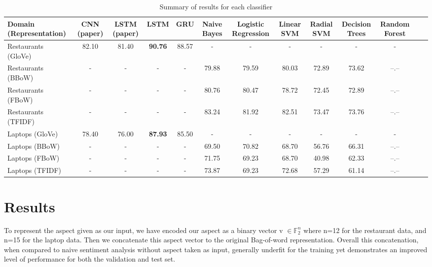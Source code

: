 \documentclass[comsoc,conference]{IEEEtran}
\begin{document}
\begin{table}
\label{my-label}
\begin{tabularx}{\textwidth}{@{}l*{11}{C}c@{}}
\toprule
Domain (Representation) & CNN (paper) & LSTM (paper) & LSTM & GRU & Naive Bayes & Logistic Regression & Linear SVM & Radial SVM & Decision Trees & Random Forest \\ 
\midrule
Restaurants (GloVe)    & 82.10 & 81.40 & \textbf{90.76} & 88.57 & -     & -     & -     & -     & -     & -     \\
Restaurants (BBoW)     & -     & -     & -              & -     & 79.88 & 79.59 & 80.03 & 72.89 & 73.62 & --.-- \\
Restaurants (FBoW)     & -     & -     & -              & -     & 80.76 & 80.47 & 78.72 & 72.45 & 72.89 & --.-- \\
Restaurants (TFIDF)    & -     & -     & -              & -     & 83.24 & 81.92 & 82.51 & 73.47 & 73.76 & --.-- \\
Laptops (GloVe)        & 78.40 & 76.00 & \textbf{87.93} & 85.50 & -     & -     & -     & -     & -     & -     \\
Laptops (BBoW)         & -     & -     & -              & -     & 69.50 & 70.82 & 68.70 & 56.76 & 66.31 & --.-- \\
Laptops (FBoW)         & -     & -     & -              & -     & 71.75 & 69.23 & 68.70 & 40.98 & 62.33 & --.-- \\
Laptops (TFIDF)        & -     & -     & -              & -     & 73.87 & 69.23 & 72.68 & 57.29 & 61.14 & --.-- \\
\bottomrule
\end{tabularx}
\caption{Summary of results for each classifier}
\end{table}

\newpage

\section{Results}
To represent the aspect given as our input, we have encoded our aspect as a binary vector v $\in \mathbb{F}_2 ^n$ where n=12 for the restaurant data, and n=15 for the laptop data. Then we concatenate this aspect vector to the original Bag-of-word representation. Overall this concatenation, when compared to naive sentiment analysis without aspect taken as input, generally underfit for the training yet demonstrates an improved level of performance for both the validation and test set.
\end{document}
